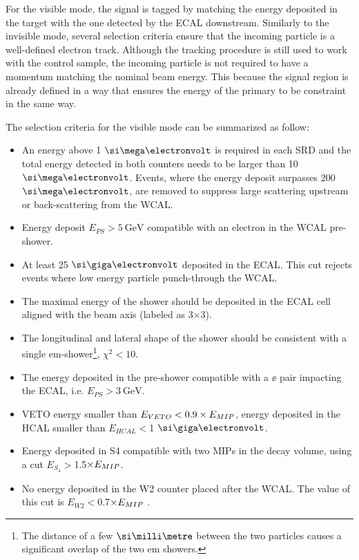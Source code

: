 For the visible mode, the signal is tagged by matching the energy deposited in the target with the one detected by the ECAL downstream. Similarly to the invisible mode, several selection criteria ensure that the incoming particle is a well-defined electron track. Although the tracking procedure is still used to work with the control sample, the incoming particle is not required to have a momentum matching the nominal beam energy. This because the signal region is already defined in a way that ensures the energy of the primary to be constraint in the same way.

The selection criteria for the visible mode can be summarized as follow:

\begin{itemize}
\item An energy above 1 $\mev$ is required in each SRD and the total energy detected in both counters needs to be larger than 10 $\mev$. Events, where the energy deposit surpasses 200 $\mev$, are removed to suppress large scattering upstream or back-scattering from the WCAL.
\item Energy deposit $E_{PS} > \SI{5}{\giga\electronvolt}$ compatible with an electron in the WCAL pre-shower.
\item At least 25 $\gev$ deposited in the ECAL. This cut rejects events where low energy particle punch-through the WCAL.
\item The maximal energy of the shower should be deposited in the ECAL cell aligned with the beam axis (labeled as 3$\times$3). 
\item The longitudinal and lateral shape of the shower should be consistent with a single em-shower\footnote{The distance of a few $\mmi$ between the two particles causes a significant overlap of the two em showers.}, $\chi^2 < 10$.
\item The energy deposited in the pre-shower compatible with a $\ee$ pair impacting the ECAL, i.e. $E_{PS} > \SI{3}{\giga\electronvolt}$.
\item VETO energy smaller than $E_{VETO} < 0.9\times E_{MIP}$, energy deposited in the HCAL smaller than $E_{HCAL}<$1 $\gev$.
\item Energy deposited in S4 compatible with two MIPs in the decay volume, using a cut $E_{S_4} > $1.5$\times E_{MIP}$.
\item  No energy deposited in the W2 counter placed after the WCAL. The value of this cut is $E_{W2} < $0.7$\times E_{MIP}$ \cite{Banerjee:2019hmi}.
\end{itemize}

